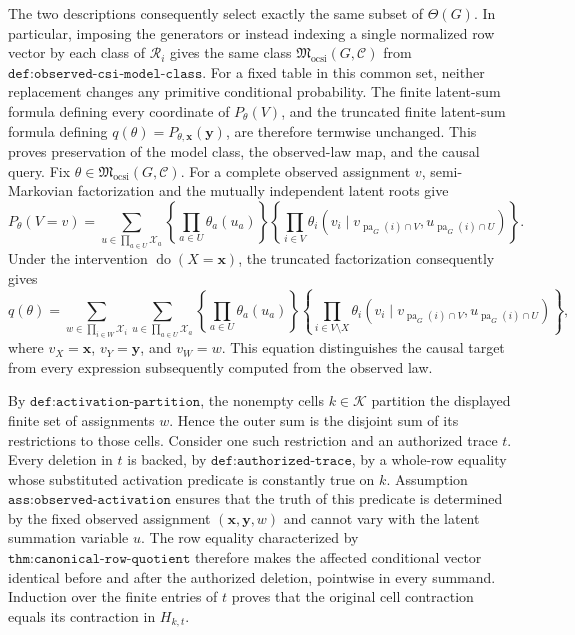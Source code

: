 The two descriptions consequently select exactly the same subset of \(\Theta(G)\). In particular, imposing the generators or instead indexing a single normalized row vector by each class of \(\mathcal R_i\) gives the same class \(\mathfrak M_{\mathrm{ocsi}}(G,\mathcal C)\) from \(\texttt{def:observed-csi-model-class}\). For a fixed table in this common set, neither replacement changes any primitive conditional probability. The finite latent-sum formula defining every coordinate of \(P_\theta(V)\), and the truncated finite latent-sum formula defining \(q(\theta)=P_{\theta,\mathbf x}(\mathbf y)\), are therefore termwise unchanged. This proves preservation of the model class, the observed-law map, and the causal query.
Fix \(\theta\in\mathfrak M_{\mathrm{ocsi}}(G,\mathcal C)\). For a complete observed assignment \(v\), semi-Markovian factorization and the mutually independent latent roots give
\[
 P_\theta(V=v)
 =\sum_{u\in\prod_{a\in U}\mathcal X_a}
   \left\{\prod_{a\in U}\theta_a(u_a)\right\}
   \left\{\prod_{i\in V}\theta_i(v_i\mid v_{\operatorname{pa}_G(i)\cap V},u_{\operatorname{pa}_G(i)\cap U})\right\}.
\]
Under the intervention \(\operatorname{do}(X=\mathbf x)\), the truncated factorization consequently gives
\[
 q(\theta)
 =\sum_{w\in\prod_{i\in W}\mathcal X_i}
   \sum_{u\in\prod_{a\in U}\mathcal X_a}
   \left\{\prod_{a\in U}\theta_a(u_a)\right\}
   \left\{\prod_{i\in V\setminus X}
     \theta_i(v_i\mid v_{\operatorname{pa}_G(i)\cap V},u_{\operatorname{pa}_G(i)\cap U})\right\},
\]
where \(v_X=\mathbf x\), \(v_Y=\mathbf y\), and \(v_W=w\). This equation distinguishes the causal target from every expression subsequently computed from the observed law.

By \(\texttt{def:activation-partition}\), the nonempty cells \(k\in\mathcal K\) partition the displayed finite set of assignments \(w\). Hence the outer sum is the disjoint sum of its restrictions to those cells. Consider one such restriction and an authorized trace \(t\). Every deletion in \(t\) is backed, by \(\texttt{def:authorized-trace}\), by a whole-row equality whose substituted activation predicate is constantly true on \(k\). Assumption \(\texttt{ass:observed-activation}\) ensures that the truth of this predicate is determined by the fixed observed assignment \((\mathbf x,\mathbf y,w)\) and cannot vary with the latent summation variable \(u\). The row equality characterized by \(\texttt{thm:canonical-row-quotient}\) therefore makes the affected conditional vector identical before and after the authorized deletion, pointwise in every summand. Induction over the finite entries of \(t\) proves that the original cell contraction equals its contraction in \(H_{k,t}\).

